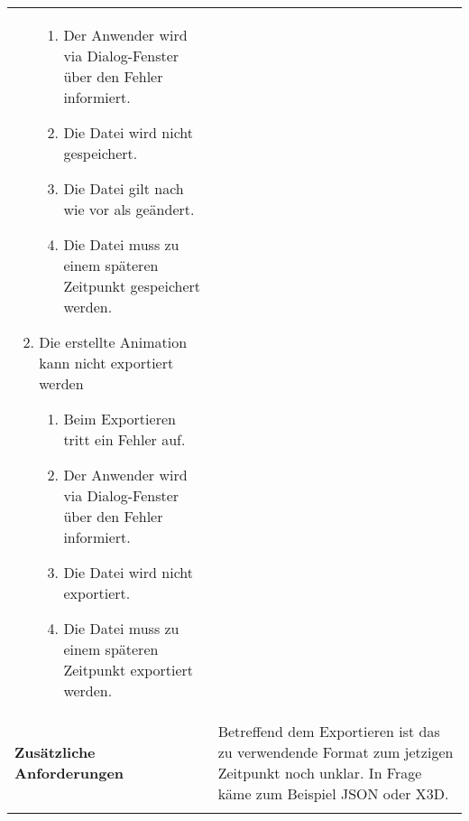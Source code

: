 \begin{longtabu}{p{0.5\textwidth}p{0.5\textwidth}}
\begin{enumerate}[label= (\alph*)]
{\begin{enumerate}[label= (\roman*)]
                    \item{Der Anwender wird via Dialog-Fenster über den Fehler
                            informiert.}
                    \item{Die Datei wird nicht gespeichert.}
                    \item{Die Datei gilt nach wie vor als geändert.}
                    \item{Die Datei muss zu einem späteren Zeitpunkt
                            gespeichert werden.}
                \end{enumerate}
            }
            \item{Die erstellte Animation kann nicht exportiert werden
                \begin{enumerate}[label= (\roman*)]
                    \item{Beim Exportieren tritt ein Fehler auf.}
                    \item{Der Anwender wird via Dialog-Fenster über den Fehler
                            informiert.}
                    \item{Die Datei wird nicht exportiert.}
                    \item{Die Datei muss zu einem späteren Zeitpunkt
                            exportiert werden.}
                \end{enumerate}
            }
        \end{enumerate} \\
    \cmidrule(r){1-1}\cmidrule(lr){2-2}
        \textbf{Zusätzliche Anforderungen} &
        Betreffend dem Exportieren ist das zu verwendende Format zum jetzigen
        Zeitpunkt noch unklar. In Frage käme zum Beispiel
        JSON\protect\footnotemark{} oder X3D\protect\footnotemark{}.\\
    \bottomrule
\end{longtabu}
